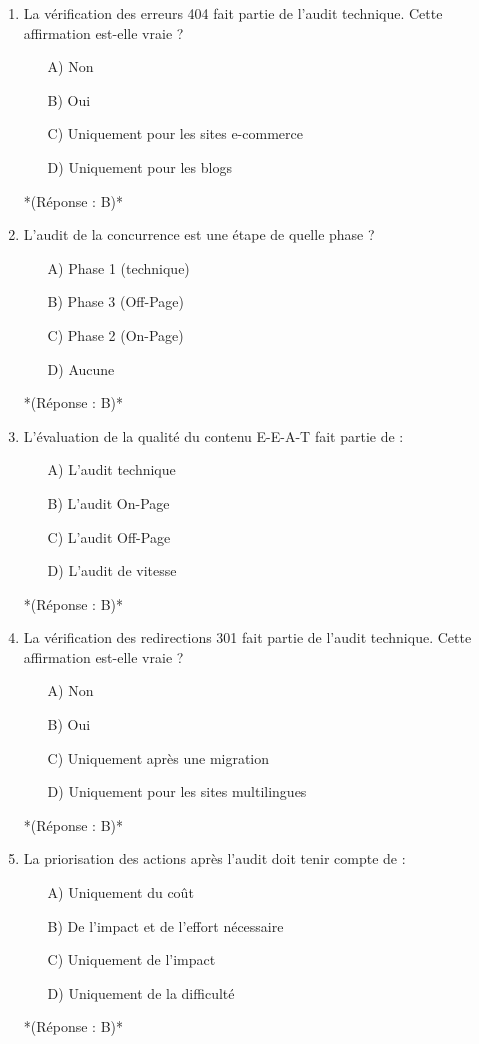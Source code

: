 \documentclass[12pt,a4paper,twoside]{report}
\begin{document}
\begin{enumerate}
    \item La vérification des erreurs 404 fait partie de l'audit technique. Cette affirmation est-elle vraie ?
    \begin{itemize}
        \item[A)] Non
        \item[B)] Oui
        \item[C)] Uniquement pour les sites e-commerce
        \item[D)] Uniquement pour les blogs
    \end{itemize}
    *(Réponse : B)*

    \item L'audit de la concurrence est une étape de quelle phase ?
    \begin{itemize}
        \item[A)] Phase 1 (technique)
        \item[B)] Phase 3 (Off-Page)
        \item[C)] Phase 2 (On-Page)
        \item[D)] Aucune
    \end{itemize}
    *(Réponse : B)*

    \item L'évaluation de la qualité du contenu E-E-A-T fait partie de :
    \begin{itemize}
        \item[A)] L'audit technique
        \item[B)] L'audit On-Page
        \item[C)] L'audit Off-Page
        \item[D)] L'audit de vitesse
    \end{itemize}
    *(Réponse : B)*

    \item La vérification des redirections 301 fait partie de l'audit technique. Cette affirmation est-elle vraie ?
    \begin{itemize}
        \item[A)] Non
        \item[B)] Oui
        \item[C)] Uniquement après une migration
        \item[D)] Uniquement pour les sites multilingues
    \end{itemize}
    *(Réponse : B)*

    \item La priorisation des actions après l'audit doit tenir compte de :
    \begin{itemize}
        \item[A)] Uniquement du coût
        \item[B)] De l'impact et de l'effort nécessaire
        \item[C)] Uniquement de l'impact
        \item[D)] Uniquement de la difficulté
    \end{itemize}
    *(Réponse : B)*


\end{enumerate}
\end{document}
